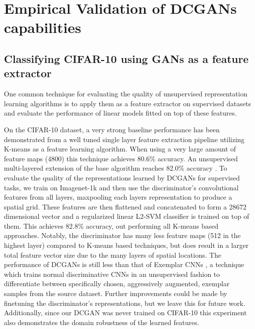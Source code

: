 \documentclass{article} \usepackage{iclr2016_conference,times}
\begin{document}
\section{Empirical Validation of DCGANs capabilities}

\subsection{Classifying CIFAR-10 using GANs as a feature extractor}

One common technique for evaluating the quality of unsupervised representation learning algorithms is to apply them as a feature extractor on supervised datasets and evaluate the performance of linear models fitted on top of these features. 

On the CIFAR-10 dataset, a very strong baseline performance has been demonstrated from a well tuned single layer feature extraction pipeline utilizing K-means as a feature learning algorithm. When using a very large amount of feature maps (4800) this technique achieves 80.6\% accuracy. An unsupervised multi-layered extension of the base algorithm reaches 82.0\% accuracy \citep{coates2011selecting}. To evaluate the quality of the representations learned by DCGANs for supervised tasks, we train on Imagenet-1k and then use the discriminator's convolutional features from all layers, maxpooling each layers representation to produce a  spatial grid. These features are then flattened and concatenated to form a 28672 dimensional vector and a regularized linear L2-SVM classifier is trained on top of them. This achieves 82.8\% accuracy, out performing all K-means based approaches. Notably, the discriminator has many less feature maps (512 in the highest layer) compared to K-means based techniques, but does result in a larger total feature vector size due to the many layers of  spatial locations. The performance of DCGANs is still less than that of Exemplar CNNs \citep{dosovitskiy2014discriminative}, a technique which trains normal discriminative CNNs in an unsupervised fashion to differentiate between specifically chosen, aggressively augmented, exemplar samples from the source dataset. Further improvements could be made by finetuning the discriminator's representations, but we leave this for future work. Additionally, since our DCGAN was never trained on CIFAR-10 this experiment also demonstrates the domain robustness of the learned features. 
\end{document}
